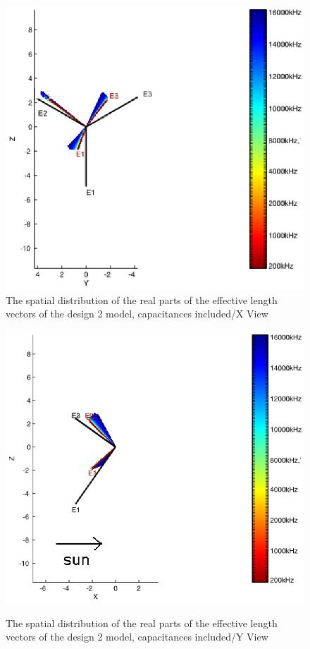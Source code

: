 \documentclass[a4paper,10pt]{thesis}
\begin{document}
\begin{figure}
\begin{center}
\includegraphics[width=12cm]{HeffVerteilungHGAD2-XView_caps.eps}\\
\caption{The spatial distribution of the real parts of the effective length vectors of the design 2 model, capacitances included/X View}\label{fig_heff_dist_HGA_D2_A_X_View_caps}
\includegraphics[width=12cm]{HeffVerteilungHGAD2-YView_caps.eps} \\
\caption{The spatial distribution of the real parts of the effective length vectors of the design 2 model, capacitances included/Y View}\label{fig_heff_dist_HGA_D2_A_Y_View_caps}
\end{center}
\end{figure}
\end{document}
